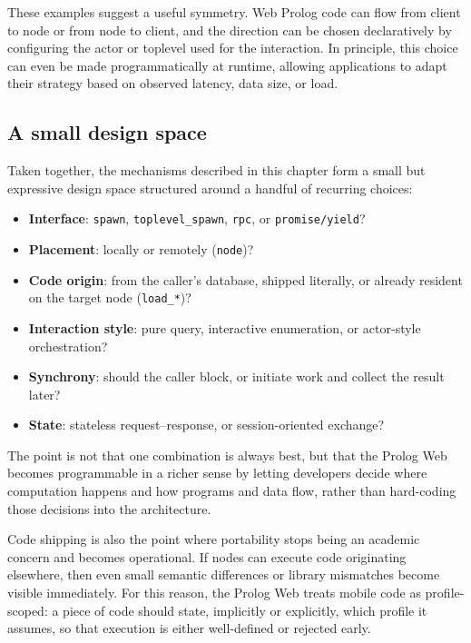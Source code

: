 These examples suggest a useful symmetry. Web Prolog code can flow
from client to node or from node to client, and the direction can be
chosen declaratively by configuring the actor or toplevel used for
the interaction. In principle, this choice can even be made
programmatically at runtime, allowing applications to adapt their
strategy based on observed latency, data size, or load.


\subsection{A small design space}
\label{sec:design-space}

Taken together, the mechanisms described in this chapter form a small
but expressive design space structured around a handful of recurring
choices:

\begin{itemize}
\item \textbf{Interface}: \texttt{spawn}, \texttt{toplevel\_spawn},
  \texttt{rpc}, or \texttt{promise/yield}?
\item \textbf{Placement}: locally or remotely (\texttt{node})?
\item \textbf{Code origin}: from the caller's database, shipped
  literally, or already resident on the target node
  (\texttt{load\_*})?
\item \textbf{Interaction style}: pure query, interactive
  enumeration, or actor-style orchestration?
\item \textbf{Synchrony}: should the caller block, or initiate work
  and collect the result later?
\item \textbf{State}: stateless request--response, or
  session-oriented exchange?
\end{itemize}

\noindent The point is not that one combination is always best, but
that the Prolog Web becomes programmable in a richer sense by letting
developers decide where computation happens and how programs and data
flow, rather than hard-coding those decisions into the architecture.

Code shipping is also the point where portability stops being an
academic concern and becomes operational. If nodes can execute code
originating elsewhere, then even small semantic differences or
library mismatches become visible immediately. For this reason, the
Prolog Web treats mobile code as profile-scoped: a piece of code
should state, implicitly or explicitly, which profile it assumes, so
that execution is either well-defined or rejected early.

